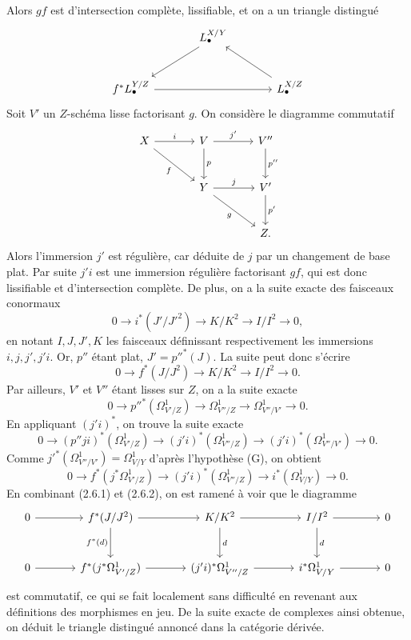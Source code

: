 \documentclass[11pt]{article}
\begin{document}
Alors $gf$ est d'intersection complète, lissifiable, et on a un triangle distingué
\[
\begin{tikzcd}[column sep=large,row sep=large]
& L^{X/Y}_\bullet \arrow[dl] \\
f^*L^{Y/Z}_\bullet \arrow[rr] && L^{X/Z}_\bullet \arrow[ul]
\end{tikzcd}
\]
Soit $V'$ un $Z$-schéma lisse factorisant $g$. On considère le diagramme commutatif
\[
\begin{tikzcd}[column sep=large,row sep=large]
X \arrow[r,"i"] \arrow[dr,"f"'] & V \arrow[r,"j'"] \arrow[d,"p"] & V'' \arrow[d,"p''"]\\
& Y \arrow[r,"j"] \arrow[dr,"g"'] & V' \arrow[d,"p'"]\\
& & Z .
\end{tikzcd}
\]
Alors l'immersion $j'$ est régulière, car déduite de $j$ par un changement de base plat. Par suite $j'i$ est une immersion régulière factorisant $gf$, qui est donc lissifiable et d'intersection complète. De plus, on a la suite exacte des faisceaux conormaux
\[
0\longrightarrow i^*(J'/J'^2)\longrightarrow K/K^2\longrightarrow I/I^2\longrightarrow0,
\]
en notant $I,J,J',K$ les faisceaux définissant respectivement les immersions $i,j,j',j'i$. Or, $p''$ étant plat, $J'=p''^*(J)$. La suite peut donc s'écrire
\begin{equation}\tag{2.6.1}
0\longrightarrow f^*(J/J^2)\longrightarrow K/K^2\longrightarrow I/I^2\longrightarrow0.
\end{equation}
Par ailleurs, $V'$ et $V''$ étant lisses sur $Z$, on a la suite exacte
\[
0\longrightarrow p''^*(\Omega^1_{V'/Z})\longrightarrow\Omega^1_{V''/Z}\longrightarrow\Omega^1_{V''/V'}\longrightarrow0.
\]
En appliquant $(j'i)^*$, on trouve la suite exacte
\[
0\longrightarrow (p''ji)^*(\Omega^1_{V'/Z})\longrightarrow (j'i)^*(\Omega^1_{V''/Z})\longrightarrow (j'i)^*(\Omega^1_{V''/V'})\longrightarrow0.
\]
Comme $j'^*(\Omega^1_{V''/V'})=\Omega^1_{V/Y}$ d'après l'hypothèse (G), on obtient
\begin{equation}\tag{2.6.2}
0\longrightarrow f^*(j^*\Omega^1_{V'/Z})\longrightarrow (j'i)^*(\Omega^1_{V''/Z})\longrightarrow i^*(\Omega^1_{V/Y})\longrightarrow0.
\end{equation}
En combinant (2.6.1) et (2.6.2), on est ramené à voir que le diagramme
\[
\begin{tikzcd}[column sep=large,row sep=large]
0 \arrow[r] & f^*(J/J^2) \arrow[r] \arrow[d,"f^*(d)"'] & K/K^2 \arrow[r] \arrow[d,"d"] & I/I^2 \arrow[r] \arrow[d,"d"] & 0\\
0 \arrow[r] & f^*(j^*\Omega^1_{V'/Z}) \arrow[r] & (j'i)^*\Omega^1_{V''/Z} \arrow[r] & i^*\Omega^1_{V/Y} \arrow[r] & 0
\end{tikzcd}
\]
est commutatif, ce qui se fait localement sans difficulté en revenant aux définitions des morphismes en jeu. De la suite exacte de complexes ainsi obtenue, on déduit le triangle distingué annoncé dans la catégorie dérivée.
\end{document}
